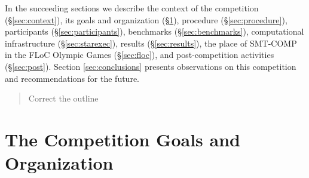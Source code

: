 \documentclass[twoside,11pt]{article}
\newcommand{\comment}[2]{\begin{quote}\sc #1\marginpar{\textcolor{red}{$\ast^{\mbox{#2}}$}}\end{quote}}
\newcommand{\davidc}[1]{\comment{#1}{DC}}
\begin{document}
In the succeeding sections we describe the context of the competition (\S\ref{sec:context}), its goals and organization (\S\ref{sec:goals}), procedure (\S\ref{sec:procedure}), participants (\S\ref{sec:participants}), benchmarks (\S\ref{sec:benchmarks}), computational infrastructure (\S\ref{sec:starexec}), results (\S\ref{sec:results}), the place of SMT-COMP in the FLoC Olympic Games (\S\ref{sec:floc}), and post-competition activities (\S\ref{sec:post}). Section \ref{sec:conclusions} presents observations on this competition and recommendations for the future.

\davidc{Correct the outline}

\section{The Competition Goals and Organization}
\label{sec:goals}
\end{document}
